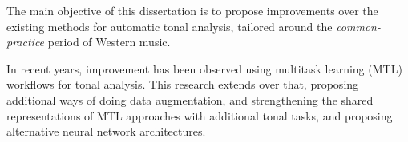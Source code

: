 The main objective of this dissertation is to propose
improvements over the existing methods for automatic tonal
analysis, tailored around the \emph{common-practice} period
of Western music.

In recent years, improvement has been observed using
multitask learning (MTL) workflows for tonal analysis. This
research extends over that, proposing additional ways of
doing data augmentation, and strengthening the shared
representations of MTL approaches with additional tonal
tasks, and proposing alternative neural network
architectures.
